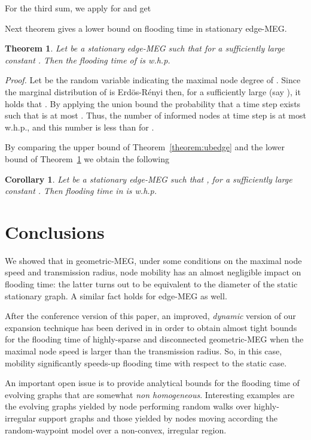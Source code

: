 \documentclass[10pt,a4paper]{article}
\newtheorem{theorem}[definition]{Theorem}
\newtheorem{cor}[definition]{Corollary}
\newcommand{\proof}{\noindent\textit{Proof. }}
\newcommand{\qed}{\hspace{\stretch{1}}}
\begin{document}
\noindent For the third sum, we apply  for  and get

\qed


\noindent Next theorem gives a lower bound on flooding time in stationary edge-MEG.
\begin{theorem}\label{theorem:edgelower}
Let  be a stationary edge-MEG such that  for
a sufficiently large constant . Then the flooding time of  is w.h.p.

\end{theorem}


\proof Let  be the random variable indicating the maximal node degree of . Since the marginal distribution of  is Erd\"os-R\'enyi  then, for a sufficiently large  (say ), it holds that . By applying the union bound the probability that a time step  exists such that  is at most . Thus, the number of informed nodes at time step  is at most  w.h.p., and this number is less than  for .
\qed

\noindent By comparing the upper bound of Theorem~\ref{theorem:ubedge} and the lower bound of
Theorem~\ref{theorem:edgelower} we obtain the following

\begin{cor} Let   be a stationary edge-MEG such that , for a sufficiently large constant . Then flooding time in  is w.h.p.

\end{cor}



\section{Conclusions} \label{sec::concl}
We showed that in geometric-MEG, under some conditions on the maximal node speed and transmission radius, node mobility has an almost negligible impact on flooding time: the latter turns out to be equivalent to the diameter of the static stationary graph. A similar fact holds for edge-MEG as well.

\noindent After the conference version of this paper, an improved, \emph{dynamic} version of our expansion technique has been derived in \cite{CPS09} in order to obtain almost tight bounds for the flooding time of highly-sparse and disconnected geometric-MEG when the maximal node speed is larger than the transmission radius. So, in this case, mobility significantly speeds-up flooding time with respect to the static case.

An important open issue is to provide analytical bounds for the flooding time of evolving graphs that are somewhat
\emph{non homogeneous}. Interesting examples are the evolving graphs yielded by node performing random walks over highly-irregular support graphs and those yielded by nodes moving according the random-waypoint model over a non-convex, irregular region.



\end{document}
